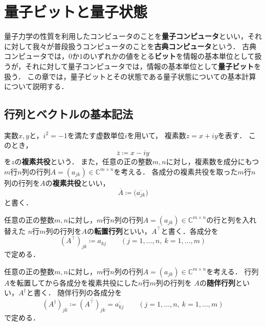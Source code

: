 \section{量子ビットと量子状態}
\label{sec:qubit-state}

量子力学の性質を利用したコンピュータのことを\textbf{量子コンピュータ}といい，それに対して我々が普段扱うコンピュータのことを\textbf{古典コンピュータ}という．
古典コンピュータでは，$0$か$1$のいずれかの値をとる\textbf{ビット}を情報の基本単位として扱うが，それに対して量子コンピュータでは，情報の基本単位として\textbf{量子ビット}を扱う．
この章では，量子ビットとその状態である量子状態についての基本計算について説明する．

\subsection{行列とベクトルの基本記法}

\begin{defi}[複素共役]
  実数$x,y$と，$i^2=-1$を満たす虚数単位$i$を用いて，
  複素数$z=x+iy$を表す．
  このとき，
  \begin{equation*}
    \overline{z}\coloneq x-iy
  \end{equation*}
  を$z$の\textbf{複素共役}という．
  また，任意の正の整数$m,n$に対し，複素数を成分にもつ$m$行$n$列の行列$A=(a_{jk}) \in \mathbb{C}^{m\times n}$を考える．
  各成分の複素共役を取った$m$行$n$列の行列を$A$の\textbf{複素共役}といい，
  \begin{equation*}
    \overline{A}\coloneq\bigl(\overline{a_{jk}}\bigr)
  \end{equation*}
  と書く．
\end{defi}

\begin{defi}[転置]
  任意の正の整数$m,n$に対し，$m$行$n$列の行列$A=(a_{jk}) \in \mathbb{C}^{m\times n}$の行と列を入れ替えた
  $n$行$m$列の行列を$A$の\textbf{転置行列}といい，$A^\top$と書く．各成分を
  \begin{equation*}
    (A^\top)_{jk}\coloneq a_{kj}
    \qquad (j=1,\ldots,n,\ k=1,\ldots,m)
  \end{equation*}
  で定める．
\end{defi}

\begin{defi}[随伴行列]
  任意の正の整数$m,n$に対し，$m$行$n$列の行列$A=(a_{jk}) \in \mathbb{C}^{m\times n}$を考える．
  行列$A$を転置してから各成分を複素共役にした$n$行$m$列の行列を
  $A$の\textbf{随伴行列}といい，$A^{\dagger}$と書く．
  随伴行列の各成分を
  \begin{equation*}
    (A^{\dagger})_{jk}\coloneq\overline{(A^\top)_{jk}}=\overline{a_{kj}}
    \qquad (j=1,\ldots,n,\ k=1,\ldots,m)
  \end{equation*}
  で定める．
\end{defi}


